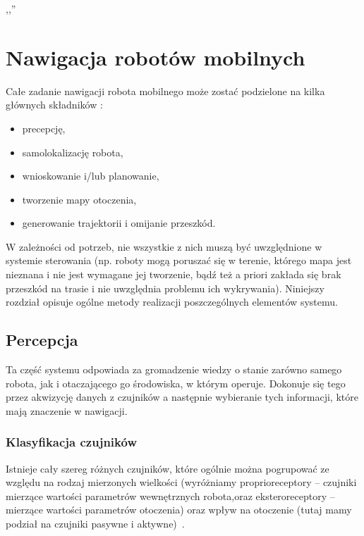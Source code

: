 

\begin{savequote}[70mm]
,,''
\qauthor{}
\end{savequote}

\chapter{Nawigacja robotów mobilnych}
\label{chap:nawigacja}

Całe zadanie nawigacji robota mobilnego może zostać podzielone na kilka głównych
składników \cite[cz.~9]{szynkiewiczWR}:

\begin{itemize}
  \item precepcję,
  \item samolokalizację robota,
  \item wnioskowanie i/lub planowanie,
  \item tworzenie mapy otoczenia,
  \item generowanie trajektorii i omijanie przeszkód.
\end{itemize}

W zależności od potrzeb, nie wszystkie z nich muszą być uwzględnione w systemie
sterowania (np. roboty mogą poruszać się w terenie, którego mapa jest nieznana
i nie jest wymagane jej tworzenie, bądź też a priori zakłada się brak
przeszkód na trasie i nie uwzględnia problemu ich wykrywania). Niniejszy
rozdział opisuje ogólne metody realizacji poszczególnych elementów systemu.

\section{Percepcja}

Ta część systemu odpowiada za gromadzenie wiedzy o stanie zarówno samego robota,
jak i otaczającego go środowiska, w którym operuje. Dokonuje się tego przez
akwizycję danych z czujników a następnie wybieranie tych informacji, które mają
znaczenie w nawigacji.

\subsection{Klasyfikacja czujników}

Istnieje cały szereg różnych
czujników, które ogólnie można pogrupować ze względu na rodzaj mierzonych
wielkości (wyróżniamy proprioreceptory -- czujniki mierzące wartości parametrów
wewnętrznych robota,oraz eksteroreceptory -- mierzące wartości parametrów
otoczenia) oraz wpływ na otoczenie (tutaj mamy podział na czujniki pasywne i
aktywne)~\cite{siegwart}.


